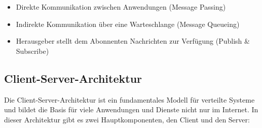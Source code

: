 \documentclass[../vs-script-first-v01.tex]{subfiles}
\begin{document}
\begin{itemize}
\item Direkte Kommunikation zwischen Anwendungen (Message Passing)
\item Indirekte Kommunikation über eine Warteschlange (Message Queueing)
\item Herausgeber stellt dem Abonnenten Nachrichten zur Verfügung (Publish \& Subscribe)
\end{itemize}


\newpage
\subsection{Client-Server-Architektur}
Die Client-Server-Architektur ist ein fundamentales Modell für verteilte Systeme und bildet die Basis für viele Anwendungen und Dienste nicht nur im Internet. In dieser Architektur gibt es zwei Hauptkomponenten, den Client und den Server:
\end{document}
